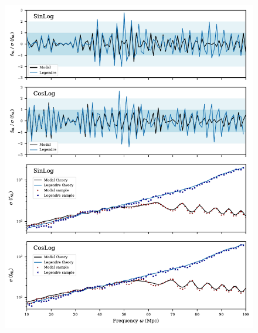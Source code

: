 \documentclass[a4paper,12pt,times,custombib,print,index]{Classes/PhDThesisPSnPDF} %
\providecommand{\DIFaddbeginFL}{} %
\providecommand{\DIFdelbeginFL}{} %
\providecommand{\DIFdelendFL}{} %
\newcommand{\DIFscaledelfig}{0.5}
\newlength{\DIFdelgraphicswidth} %
\newlength{\DIFdelgraphicsheight} %
\newcommand{\DIFaddincludegraphics}[2][]{{\color{blue}\fbox{\DIFOincludegraphics[#1]{#2}}}} %
\newcommand{\DIFdelincludegraphics}[2][]{%
\sbox{\DIFdelgraphicsbox}{\DIFOincludegraphics[#1]{#2}}%
\settoboxwidth{\DIFdelgraphicswidth}{\DIFdelgraphicsbox} %
\settoboxtotalheight{\DIFdelgraphicsheight}{\DIFdelgraphicsbox} %
\scalebox{\DIFscaledelfig}{%
\parbox[b]{\DIFdelgraphicswidth}{\usebox{\DIFdelgraphicsbox}\\[-\baselineskip] \rule{\DIFdelgraphicswidth}{0em}}\llap{\resizebox{\DIFdelgraphicswidth}{\DIFdelgraphicsheight}{%
\setlength{\unitlength}{\DIFdelgraphicswidth}%
\begin{picture}(1,1)%
\thicklines\linethickness{2pt} %
{\color[rgb]{1,0,0}\put(0,0){\framebox(1,1){}}}%
{\color[rgb]{1,0,0}\put(0,0){\line( 1,1){1}}}%
{\color[rgb]{1,0,0}\put(0,1){\line(1,-1){1}}}%
\end{picture}%
}\hspace*{3pt}}} %
} %
\DeclareRobustCommand{\DIFaddbeginFL}{\DIFOaddbeginFL \let\includegraphics\DIFaddincludegraphics} %
\DeclareRobustCommand{\DIFdelbeginFL}{\DIFOdelbeginFL \let\includegraphics\DIFdelincludegraphics} %
\DeclareRobustCommand{\DIFdelendFL}{\DIFOaddendFL \let\includegraphics\DIFOincludegraphics} %
\begin{document}
\begin{figure}[htbp!] 
	\centering    
	\DIFdelbeginFL %
\DIFdelendFL \DIFaddbeginFL \includegraphics{sinlog_template_frequency_Legendre_Modal.pdf}

\end{figure}
\end{document}
